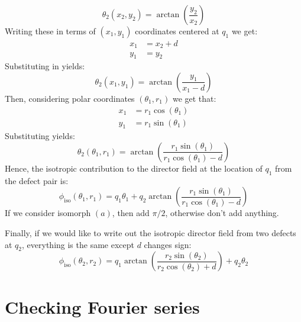 \documentclass[reqno]{article}
\begin{document}
\begin{equation}
    \theta_2(x_2, y_2) = \arctan\left(\frac{y_2}{x_2}\right)
\end{equation}
Writing these in terms of $(x_1, y_1)$ coordinates centered at $q_1$ we get:
\begin{equation}
    \begin{split}
        x_1 &= x_2 + d \\
        y_1 &= y_2
    \end{split}
\end{equation}
Substituting in yields:
\begin{equation}
    \theta_2(x_1, y_1)
    =
    \arctan \left(\frac{y_1}{x_1 - d}\right)
\end{equation}
Then, considering polar coordinates $(\theta_1, r_1)$ we get that:
\begin{equation}
    \begin{split}
        x_1 &= r_1 \cos(\theta_1) \\
        y_1 &= r_1 \sin(\theta_1)
    \end{split}
\end{equation}
Substituting yields:
\begin{equation}
    \theta_2(\theta_1, r_1)
    =
    \arctan \left(\frac{r_1 \sin(\theta_1)}{r_1 \cos(\theta_1) - d}\right)
\end{equation}
Hence, the isotropic contribution to the director field at the location of $q_1$ from the defect pair is:
\begin{equation}
    \phi_\text{iso}(\theta_1, r_1)
    =
    q_1 \theta_1
    +
    q_2 \arctan\left(\frac{r_1 \sin(\theta_1)}{r_1 \cos(\theta_1) - d}\right)
\end{equation}
If we consider isomorph $(a)$, then add $\pi / 2$, otherwise don't add anything.

Finally, if we would like to write out the isotropic director field from two defects at $q_2$, everything is the same except $d$ changes sign:
\begin{equation}
    \phi_\text{iso}(\theta_2, r_2)
    =
    q_1 \arctan\left(\frac{r_2 \sin(\theta_2)}{r_2 \cos(\theta_2) + d}\right)
    +
    q_2 \theta_2
\end{equation}

\section{Checking Fourier series}
\end{document}
